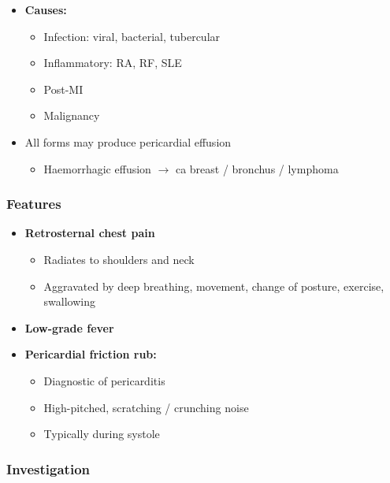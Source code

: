 \documentclass[
  12pt,
]{memoir}
\providecommand{\tightlist}{%
  \setlength{\itemsep}{0pt}\setlength{\parskip}{0pt}}
\begin{document}
\begin{itemize}
\tightlist
\item
  \textbf{Causes:}

  \begin{itemize}
  \tightlist
  \item
    Infection: viral, bacterial, tubercular
  \item
    Inflammatory: RA, RF, SLE
  \item
    Post-MI
  \item
    Malignancy
  \end{itemize}
\item
  All forms may produce pericardial effusion

  \begin{itemize}
  \tightlist
  \item
    Haemorrhagic effusion \(\rightarrow\) ca breast / bronchus /
    lymphoma
  \end{itemize}
\end{itemize}

\hypertarget{features-16}{%
\subsubsection{Features}\label{features-16}}

\begin{itemize}
\tightlist
\item
  \textbf{Retrosternal chest pain}

  \begin{itemize}
  \tightlist
  \item
    Radiates to shoulders and neck
  \item
    Aggravated by deep breathing, movement, change of posture, exercise,
    swallowing
  \end{itemize}
\item
  \textbf{Low-grade fever}
\item
  \textbf{Pericardial friction rub:}

  \begin{itemize}
  \tightlist
  \item
    Diagnostic of pericarditis
  \item
    High-pitched, scratching / crunching noise
  \item
    Typically during systole
  \end{itemize}
\end{itemize}

\hypertarget{investigation-19}{%
\subsubsection{Investigation}\label{investigation-19}}
\end{document}
